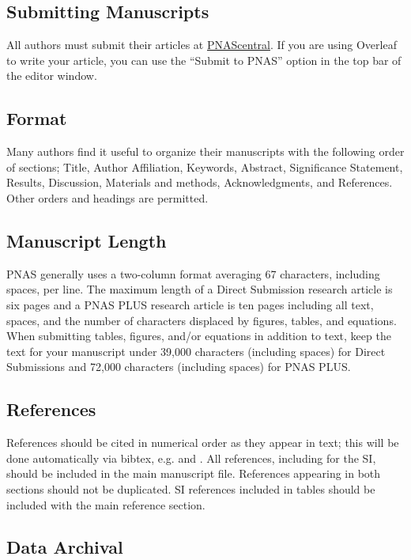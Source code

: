 \documentclass[9pt,twocolumn,twoside,lineno]{pnas-new}
\begin{document}
\subsection*{Submitting Manuscripts}

All authors must submit their articles at \href{http://www.pnascentral.org/cgi-bin/main.plex}{PNAScentral}. If you are using Overleaf to write your article, you can use the ``Submit to PNAS'' option in the top bar of the editor window. 

\subsection*{Format}

Many authors find it useful to organize their manuscripts with the following order of sections;  Title, Author Affiliation, Keywords, Abstract, Significance Statement, Results, Discussion, Materials and methods, Acknowledgments, and References. Other orders and headings are permitted.

\subsection*{Manuscript Length}

PNAS generally uses a two-column format averaging 67 characters, including spaces, per line. The maximum length of a Direct Submission research article is six pages and a PNAS PLUS research article is ten pages including all text, spaces, and the number of characters displaced by figures, tables, and equations.  When submitting tables, figures, and/or equations in addition to text, keep the text for your manuscript under 39,000 characters (including spaces) for Direct Submissions and 72,000 characters (including spaces) for PNAS PLUS.

\subsection*{References}

References should be cited in numerical order as they appear in text; this will be done automatically via bibtex, e.g. \cite{belkin2002using} and \cite{berard1994embedding,coifman2005geometric}. All references, including for the SI, should be included in the main manuscript file. References appearing in both sections should not be duplicated.  SI references included in tables should be included with the main reference section. 

\subsection*{Data Archival}
\end{document}

